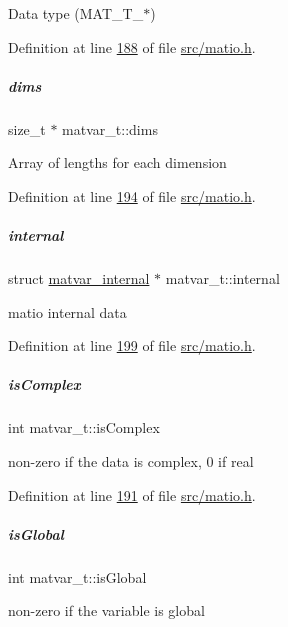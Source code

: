 Data type (M\+A\+T\+\_\+\+T\+\_\+$\ast$) 

Definition at line \hyperlink{src_2matio_8h_source_l00188}{188} of file \hyperlink{src_2matio_8h_source}{src/matio.\+h}.

\mbox{\label{group___m_a_t_a8e01234e1c862ce3472bb37f5a09b92c}} 
\subparagraph{\texorpdfstring{dims}{dims}}
{\footnotesize\ttfamily size\+\_\+t $\ast$ matvar\+\_\+t\+::dims}

Array of lengths for each dimension 

Definition at line \hyperlink{src_2matio_8h_source_l00194}{194} of file \hyperlink{src_2matio_8h_source}{src/matio.\+h}.

\mbox{\label{group___m_a_t_a6e97e3ed9f40c49322c18561c2a94e92}} 
\subparagraph{\texorpdfstring{internal}{internal}}
{\footnotesize\ttfamily struct \hyperlink{structmatvar__internal}{matvar\+\_\+internal} $\ast$ matvar\+\_\+t\+::internal}

matio internal data 

Definition at line \hyperlink{src_2matio_8h_source_l00199}{199} of file \hyperlink{src_2matio_8h_source}{src/matio.\+h}.

\mbox{\label{group___m_a_t_aeb03b3a69f108dc05470b00443a43739}} 
\subparagraph{\texorpdfstring{is\+Complex}{isComplex}}
{\footnotesize\ttfamily int matvar\+\_\+t\+::is\+Complex}

non-\/zero if the data is complex, 0 if real 

Definition at line \hyperlink{src_2matio_8h_source_l00191}{191} of file \hyperlink{src_2matio_8h_source}{src/matio.\+h}.

\mbox{\label{group___m_a_t_af26c71c4c0ddb14931d15910dddac1bc}} 
\subparagraph{\texorpdfstring{is\+Global}{isGlobal}}
{\footnotesize\ttfamily int matvar\+\_\+t\+::is\+Global}

non-\/zero if the variable is global 


